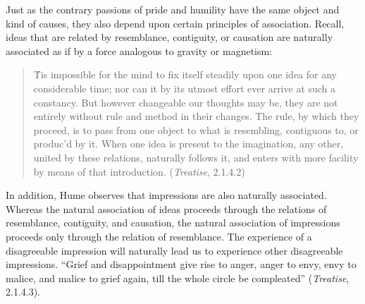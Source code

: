 % 


Just as the contrary passions of pride and humility have the same object and kind of causes, they also depend upon certain principles of association. Recall, ideas that are related by resemblance, contiguity, or causation are naturally associated as if by a force analogous to gravity or magnetism:

\begin{quote}
    \'Tis impossible for the mind to fix itself steadily upon one idea for any considerable time; nor can it by its utmost effort ever arrive at such a constancy. But however changeable our thoughts may be, they are not entirely without rule and method in their changes. The rule, by which they proceed, is to pass from one object to what is resembling, contiguous to, or produc'd by it. When one idea is present to the imagination, any other, united by these relations, naturally follows it, and enters with more facility by means of that introduction. (\emph{Treatise}, 2.1.4.2)
\end{quote}

In addition, Hume observes that impressions are also naturally associated. Whereas the natural association of ideas proceeds through the relations of resemblance, contiguity, and causation, the natural association of impressions proceeds only through the relation of resemblance. The experience of a disagreeable impression will naturally lead us to experience other disagreeable impressions. ``Grief and disappointment give rise to anger, anger to envy, envy to malice, and malice to grief again, till the whole circle be compleated'' (\emph{Treatise}, 2.1.4.3).

